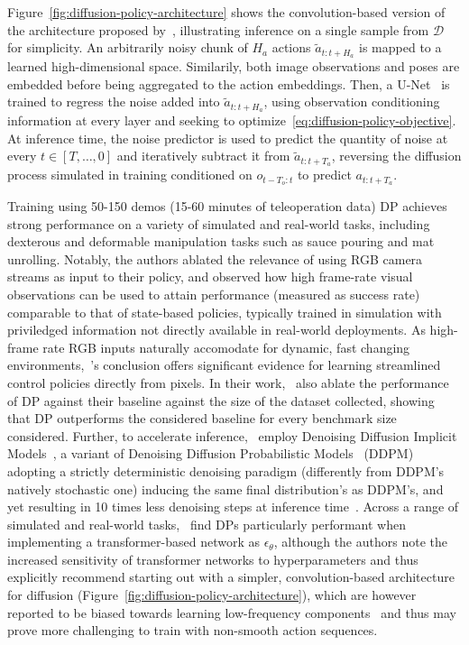 Figure~\ref{fig:diffusion-policy-architecture} shows the convolution-based version of the architecture proposed by~\citet{chiDiffusionPolicyVisuomotor2024}, illustrating inference on a single sample from \( \mathcal D \) for simplicity.
An arbitrarily noisy chunk of \( H_a \) actions \(\tilde a_{t:t+H_a} \) is mapped to a learned high-dimensional space. 
Similarily, both image observations and poses are embedded before being aggregated to the action embeddings.
Then, a U-Net~\citep{ronnebergerUNetConvolutionalNetworks2015} is trained to regress the noise added into \( \tilde a_{t:t+H_a} \), using observation conditioning information at every layer and seeking to optimize~\ref{eq:diffusion-policy-objective}.
At inference time, the noise predictor is used to predict the quantity of noise at every \( t \in [T, \dots, 0 ] \) and iteratively subtract it from \(\tilde a_{t:t+T_a} \), reversing the diffusion process simulated in training conditioned on \(o_{t-T_o:t} \) to predict \(a_{t:t+T_a} \).

Training using 50-150 demos (15-60 minutes of teleoperation data) DP achieves strong performance on a variety of simulated and real-world tasks, including dexterous and deformable manipulation tasks such as sauce pouring and mat unrolling.
Notably, the authors ablated the relevance of using RGB camera streams as input to their policy, and observed how high frame-rate visual observations can be used to attain performance (measured as success rate) comparable to that of state-based policies, typically trained in simulation with priviledged information not directly available in real-world deployments.
As high-frame rate RGB inputs naturally accomodate for dynamic, fast changing environments,~\citet{chiDiffusionPolicyVisuomotor2024}'s conclusion offers significant evidence for learning streamlined control policies directly from pixels.
In their work,~\citet{chiDiffusionPolicyVisuomotor2024} also ablate the performance of DP against their baseline against the size of the dataset collected, showing that DP outperforms the considered baseline for every benchmark size considered.
Further, to accelerate inference,~\citet{chiDiffusionPolicyVisuomotor2024} employ Denoising Diffusion Implicit Models~\citep{songDenoisingDiffusionImplicit2022}, a variant of Denoising Diffusion Probabilistic Models~\citep{hoDenoisingDiffusionProbabilistic2020} (DDPM) adopting a strictly deterministic denoising paradigm (differently from DDPM's natively stochastic one) inducing the same final distribution's as DDPM's, and yet resulting in 10 times less denoising steps at inference time~\citep{chiDiffusionPolicyVisuomotor2024}.
Across a range of simulated and real-world tasks,~\citet{chiDiffusionPolicyVisuomotor2024} find DPs particularly performant when implementing a transformer-based network as \( \epsilon_\theta \), although the authors note the increased sensitivity of transformer networks to hyperparameters and thus explicitly recommend starting out with a simpler, convolution-based architecture for diffusion (Figure~\ref{fig:diffusion-policy-architecture}), which are however reported to be biased towards learning low-frequency components~\citep{tancikFourierFeaturesLet2020} and thus may prove more challenging to train with non-smooth action sequences.


